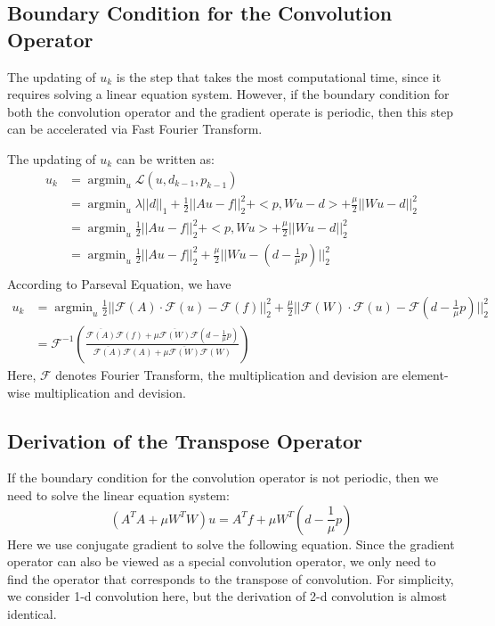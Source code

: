 \documentclass{article}
\theoremstyle{plain} \newtheorem{thm}{Theorem}
\newcommand{\cL}{\mathcal{L}}
\newcommand{\cF}{\mathcal{F}}
\begin{document}
\subsection{Boundary Condition for the Convolution Operator}
The updating of $u_k$ is the step that takes the most computational time, since it requires solving a linear equation system. However, if the boundary condition for both the convolution operator and the gradient operate is periodic, then this step can be accelerated via Fast Fourier Transform.

The updating of $u_k$ can be written as:
\begin{align*}
		u_k &= \mathop{\arg \min}_u \cL(u, d_{k-1}, p_{k-1})\\
				&= \mathop{\arg \min}_u   \lambda||d||_1 +\frac{1}{2}||A u - f||_2^2 +  <p, Wu - d> + \frac{\mu}{2} ||Wu - d||_2^2\\
				&= \mathop{\arg \min}_u \frac{1}{2}||A u - f||_2^2 + <p, Wu> + \frac{\mu}{2} ||Wu - d||_2^2\\
				& =  \mathop{\arg \min}_u \frac{1}{2}||A u - f||_2^2  + \frac{\mu}{2} ||Wu - (d - \frac{1}{\mu} p)||_2^2\\
\end{align*}
According to Parseval Equation, we have
\begin{align*}
	u_k &= \mathop{\arg \min}_u \frac{1}{2}||\cF(A)\cdot\cF(u) - \cF(f)||_2^2 + \frac{\mu}{2} ||\cF(W)\cdot\cF(u) - \cF(d - \frac{1}{\mu} p)||_2^2\\
	& =\cF^{-1}\left( \frac{\overline{\cF(A)}\cF(f) + \mu \overline{\cF(W)} \cF(d - \frac{1}{\mu} p)}{\overline{\cF(A)}\cF(A) + \mu \overline{\cF(W)} \cF(W)}\right)
\end{align*}
Here, $\cF$ denotes Fourier Transform,  the multiplication and devision are element-wise multiplication and devision. 

\subsection{Derivation of the Transpose Operator}
If the boundary condition for the convolution operator is not periodic, then we need to solve the linear equation system:
$$ (A^TA + \mu W^TW) u = A^T f + \mu W^T(d - \frac{1}{\mu}p)$$
Here we use conjugate gradient to solve the following equation. Since the gradient operator can also be viewed as a special convolution operator, we only need to find the operator that corresponds to the transpose of convolution. For simplicity, we consider 1-d convolution here, but the derivation of 2-d convolution is almost identical.
\end{document}
